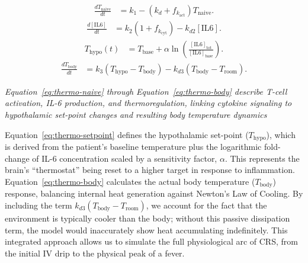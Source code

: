 \documentclass[11pt]{article}
\begin{document}
\begin{equation}
\begin{aligned}
\frac{dT_{\mathrm{naive}}}{dt} &= k_1-\left(k_d+f_{k_{\mathrm{act}}}\right)T_{\mathrm{naive}}.
\end{aligned}
\label{eq:thermo-naive}
\end{equation}
\begin{equation}
\begin{aligned}
\frac{d[\mathrm{IL6}]}{dt} &= k_2\left(1+f_{k_{\mathrm{cyt}}}\right)-k_{d2}[\mathrm{IL6}].
\end{aligned}
\label{eq:thermo-il6}
\end{equation}
\begin{equation}
\begin{aligned}
T_{\mathrm{hypo}}(t) &= T_{\mathrm{base}}+\alpha\ln\left(\frac{[\mathrm{IL6}]_{\mathrm{tot}}}{[\mathrm{IL6}]_{\mathrm{base}}}\right).
\end{aligned}
\label{eq:thermo-setpoint}
\end{equation}
\begin{equation}
\begin{aligned}
\frac{dT_{\mathrm{body}}}{dt} &= k_3\left(T_{\mathrm{hypo}}-T_{\mathrm{body}}\right)-k_{d3}\left(T_{\mathrm{body}}-T_{\mathrm{room}}\right).
\end{aligned}
\label{eq:thermo-body}
\end{equation}

\emph{Equation~\ref{eq:thermo-naive} through Equation~\ref{eq:thermo-body} describe T-cell activation, IL-6 production, and thermoregulation, linking cytokine signaling to hypothalamic set-point changes and resulting body temperature dynamics}
\par\medskip

Equation~\ref{eq:thermo-setpoint} defines the hypothalamic set-point ($T_{\mathrm{hypo}}$), which is derived from the patient’s baseline temperature plus the logarithmic fold-change of IL-6 concentration scaled by a sensitivity factor, \ensuremath{\alpha}. This represents the brain’s “thermostat” being reset to a higher target in response to inflammation. Equation~\ref{eq:thermo-body} calculates the actual body temperature ($T_{\mathrm{body}}$) response, balancing internal heat generation against Newton’s Law of Cooling. By including the term $k_{d3}(T_{\mathrm{body}}-T_{\mathrm{room}})$, we account for the fact that the environment is typically cooler than the body; without this passive dissipation term, the model would inaccurately show heat accumulating indefinitely. This integrated approach allows us to simulate the full physiological arc of CRS, from the initial IV drip to the physical peak of a fever.
\par\medskip
\end{document}
